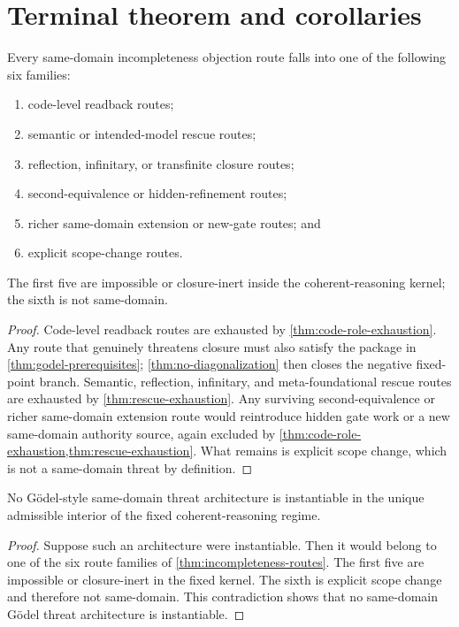 \section{Terminal theorem and corollaries}
\label{sec:terminal}

\begin{theorem}
\label{thm:incompleteness-routes}
Every same-domain incompleteness objection route falls into one of the following six families:
\begin{enumerate}[label=(\roman*), leftmargin=2.6em]
    \item code-level readback routes;
    \item semantic or intended-model rescue routes;
    \item reflection, infinitary, or transfinite closure routes;
    \item second-equivalence or hidden-refinement routes;
    \item richer same-domain extension or new-gate routes; and
    \item explicit scope-change routes.
\end{enumerate}
The first five are impossible or closure-inert inside the coherent-reasoning kernel; the sixth is not same-domain.
\end{theorem}

\begin{proof}
Code-level readback routes are exhausted by \cref{thm:code-role-exhaustion}. Any route that genuinely threatens closure must also satisfy the package in \cref{thm:godel-prerequisites}; \cref{thm:no-diagonalization} then closes the negative fixed-point branch. Semantic, reflection, infinitary, and meta-foundational rescue routes are exhausted by \cref{thm:rescue-exhaustion}. Any surviving second-equivalence or richer same-domain extension route would reintroduce hidden gate work or a new same-domain authority source, again excluded by \cref{thm:code-role-exhaustion,thm:rescue-exhaustion}. What remains is explicit scope change, which is not a same-domain threat by definition.
\end{proof}

\begin{theorem}
\label{thm:main}
No G\"odel-style same-domain threat architecture is instantiable in the unique admissible interior of the fixed coherent-reasoning regime.
\end{theorem}

\begin{proof}
Suppose such an architecture were instantiable. Then it would belong to one of the six route families of \cref{thm:incompleteness-routes}. The first five are impossible or closure-inert in the fixed kernel. The sixth is explicit scope change and therefore not same-domain. This contradiction shows that no same-domain G\"odel threat architecture is instantiable.
\end{proof}

